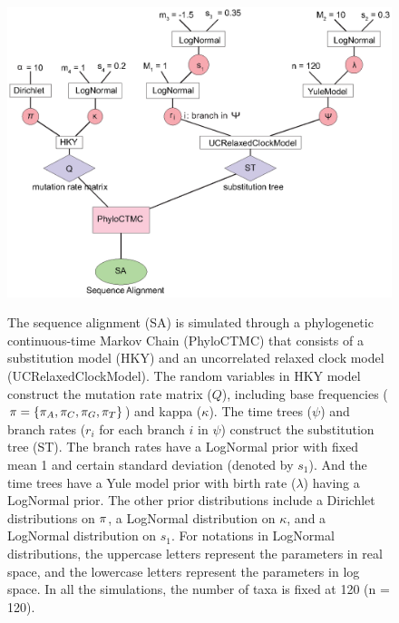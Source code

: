 \documentclass{bmcart}
\begin{document}
\begin{backmatter}
\begin{figure}[h!]
\includegraphics[width=12cm]{Fig08-modelvalidation.eps}\\
\caption{
             The sequence alignment (SA) is simulated through a phylogenetic continuous-time Markov Chain (PhyloCTMC) that consists of a substitution model (HKY) and an uncorrelated relaxed clock model (UCRelaxedClockModel). The random variables in HKY model construct the mutation rate matrix ($Q$), including base frequencies (${\bf{\pi}} = \{{\pi_A}, {\pi_C}, {\pi_G}, {\pi_T}\}$) and kappa ($\kappa$). The time trees ($\psi$) and branch rates ($r_i$ for each branch $i$ in $\psi$) construct the substitution tree (ST). The branch rates have a LogNormal prior with fixed mean 1 and certain standard deviation (denoted by ${s_1}$). And the time trees have a Yule model prior with birth rate ($\lambda$) having a LogNormal prior. The other prior distributions include a Dirichlet distributions on ${\bf{\pi}}$, a LogNormal distribution on $\kappa$, and a LogNormal distribution on ${s_1}$. For notations in LogNormal distributions, the uppercase letters represent the parameters in real space, and the lowercase letters represent the parameters in log space. In all the simulations, the number of taxa is fixed at 120 (n = 120).}
\label{modelvalidation}
\end{figure}


\end{backmatter}
\end{document}
